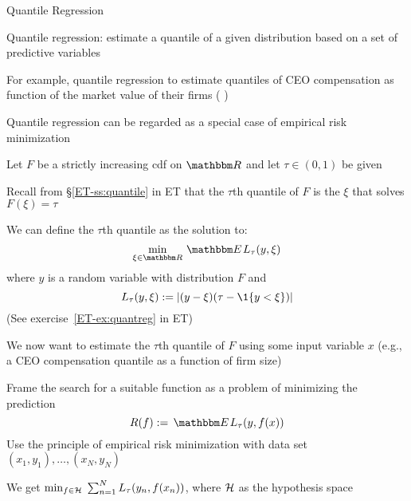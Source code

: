 \begin{frame}{Quantile Regression}

    \vspace{2em}
    Quantile regression: estimate a quantile of a given distribution based on a set of
    predictive variables
    
    \vspace{.7em}
    For example, quantile regression to
    estimate quantiles of CEO compensation as function of the
    market value of their firms (\citeauthor{koenker2001quantile} \citeyear{koenker2001quantile})
    
    \vspace{.7em}
    Quantile regression can be regarded as a special
    case of empirical risk minimization
    
\end{frame}

\begin{frame}
    
    \vspace{2em}
    Let $F$ be a strictly increasing {\sc cdf} on $\RR$ and let $\tau \in (0, 1)$ be given
    
    Recall from \S\ref{ET-ss:quantile} in ET that the $\tau$th quantile of $F$
    is the $\xi$ that solves $F(\xi) = \tau$
    
    \vspace{.7em}
    We can define the $\tau$th quantile as the
    solution to:
    \begin{equation*}
        \label{eq:altxi}
        \min_{\xi \in \RR} \, \EE L_\tau (y, \xi) 
    \end{equation*}
    where $y$ is a random variable with distribution $F$ and
    \begin{equation*}
        L_\tau (y, \xi)
        := | (y - \xi) (\tau - \1\{y < \xi\}) | 
    \end{equation*}
    (See exercise~\ref{ET-ex:quantreg} in ET)
    
\end{frame}

\begin{frame}
    
    \vspace{2em}
    We now want to estimate the $\tau$th quantile of $F$ using some
    input variable $x$ (e.g., a CEO compensation quantile as a function
    of firm size)
    
    \vspace{.7em}
    Frame the
    search for a suitable function as a problem of minimizing the prediction 
    \begin{equation*}
        \label{eq:altxi2}
        R(f) := \, \EE L_\tau (y, f(x))
    \end{equation*}
    Use the principle of empirical
    risk minimization with data set $(x_1, y_1), \ldots, (x_N, y_N)$
    
    We get $\min_{f \in \mathcal H} \; \sum_{n=1}^N L_\tau (y_n , f(x_n))$,
    where $\mathcal H$ as the hypothesis space
    
    
    
\end{frame}

